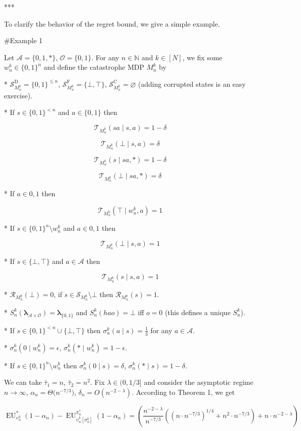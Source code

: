 \documentclass[a4paper]{article}
\newcommand{\Bool}{\{0,1\}}
\newcommand{\AP}[1]{\left(#1\right)}
\newcommand{\AB}[1]{\left[#1\right]}
\newcommand{\Nats}{\mathbb{N}}
\newcommand{\Estr}{\boldsymbol{\lambda}}
\newcommand{\Ob}{\mathcal{O}}
\newcommand{\A}{\mathcal{A}}
\newcommand{\St}{\mathcal{S}}
\newcommand{\T}{\mathcal{T}}
\newcommand{\R}{\mathcal{R}}
\newcommand{\RMC}{\mathrm{C}}
\newcommand{\RMD}{\mathrm{D}}
\newcommand{\RMF}{\mathrm{F}}
\newcommand{\SF}{\St^{\RMF}}
\newcommand{\SD}{\St^{\RMD}}
\newcommand{\SC}{\St^{\RMC}}
\newcommand{\EU}{\operatorname{EU}}
\begin{document}
***

To clarify the behavior of the regret bound, we give a simple example.

\#Example 1

Let $\A = \{0,1,*\}$, $\Ob=\Bool$. For any $n \in \Nats$ and $k \in [N]$, we fix some $w_n^k \in \Bool^n$ and define the catastrophe MDP $M_n^k$ by

* $\SD_{M_n^k} = \Bool^{\leq n}$, $\SF_{M_n^k} = \{\bot,\top\}$, $\SC_{M_n^k} = \varnothing$ (adding corrupted states is an easy exercise).

* If $s \in \Bool^{< n}$ and $a \in \Bool$ then 

$$\T_{M_n^k}(sa \mid s,a) = 1 - \delta$$

$$\T_{M_n^k}(\bot \mid s,a) = \delta$$

$$\T_{M_n^k}(s \mid sa,*) = 1 - \delta$$

$$\T_{M_n^k}(\bot \mid sa,*) = \delta$$

* If $a \in {0,1}$ then

$$\T_{M_n^k}(\top \mid w_n^k,a) = 1$$

* If $s \in \Bool^n \setminus w_n^k$ and $a \in {0,1}$ then

$$\T_{M_n^k}(\bot \mid s,a) = 1$$

* If $s \in \{\bot,\top\}$ and $a \in \A$ then

$$\T_{M_n^k}(s \mid s,a) = 1$$

* $\R_{M_n^k}(\bot)=0$, if $s \in \St_{M_n^k} \setminus \bot$ then $\R_{M_n^k}(s)=1$.

* $S_n^k(\Estr_{\A \times \Ob})=\Estr_{\Bool}$ and $S_n^k(hao)=\bot$ iff $o = 0$ (this defines a unique $S_n^k$).

* If $s \in \Bool^{<n} \cup \{\bot,\top\}$ then $\sigma_n^k(a \mid s) = \frac{1}{3}$ for any $a \in \A$.

* $\sigma_n^k(0 \mid w_n^k) = \epsilon$, $\sigma_n^k(* \mid w_n^k) = 1 - \epsilon$.

* If $s \in \Bool^n \setminus w_n^k$ then $\sigma_n^k(0 \mid s) = \delta$, $\sigma_n^k(* \mid s) = 1 - \delta$.

We can take $\bar{\tau}_1 = n$, $\bar{\tau}_2 = n^2$. Fix $\lambda \in (0,1/3]$ and consider the asymptotic regime $n \rightarrow \infty$, $\alpha_n = \Theta\Big(n^{-7/3}\Big)$, $\delta_n = O\AP{n^{-2-\lambda}}$. According to Theorem 1, we get

$$\EU_{\upsilon_n^k}^*(1-\alpha_n) - \EU_{\bar{\upsilon}_n^k\AB{\sigma_n^k}}^{\pi_n^*}(1-\alpha_n) = \AP{\frac{n^{-2-\lambda}}{n^{-7/3}}\AP{\AP{n \cdot n^{-7/3}}^{1/4}+n^2 \cdot n^{-7/3}}+n \cdot n^{-2-\lambda}}$$
\end{document}
